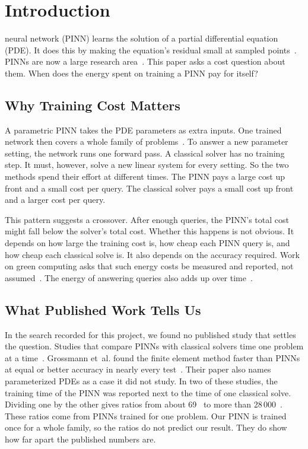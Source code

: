 \documentclass[journal]{IEEEtran}
\begin{document}
\section{Introduction}\label{sec:intro}

 neural network (PINN) learns the solution of a partial differential equation (PDE). It does this by making the equation's residual small at sampled points~\cite{raissi2019}. PINNs are now a large research area~\cite{karniadakis2021,cuomo2022,toscano2025}. This paper asks a cost question about them. When does the energy spent on training a PINN pay for itself?

\subsection{Why Training Cost Matters}
A parametric PINN takes the PDE parameters as extra inputs. One trained network then covers a whole family of problems~\cite{sun2020,wang2021deeponet}. To answer a new parameter setting, the network runs one forward pass. A classical solver has no training step. It must, however, solve a new linear system for every setting. So the two methods spend their effort at different times. The PINN pays a large cost up front and a small cost per query. The classical solver pays a small cost up front and a larger cost per query.

This pattern suggests a crossover. After enough queries, the PINN's total cost might fall below the solver's total cost. Whether this happens is not obvious. It depends on how large the training cost is, how cheap each PINN query is, and how cheap each classical solve is. It also depends on the accuracy required. Work on green computing asks that such energy costs be measured and reported, not assumed~\cite{strubell2019,schwartz2020,patterson2022}. The energy of answering queries also adds up over time~\cite{luccioni2024}.

\subsection{What Published Work Tells Us}
In the search recorded for this project, we found no published study that settles the question. Studies that compare PINNs with classical solvers time one problem at a time~\cite{grossmann2024,chuang2022,markidis2021}. Grossmann et~al. found the finite element method faster than PINNs at equal or better accuracy in nearly every test~\cite{grossmann2024}. Their paper also names parameterized PDEs as a case it did not study. In two of these studies, the training time of the PINN was reported next to the time of one classical solve. Dividing one by the other gives ratios from about 69~\cite{markidis2021} to more than 28\,000~\cite{chuang2022}. These ratios come from PINNs trained for one problem. Our PINN is trained once for a whole family, so the ratios do not predict our result. They do show how far apart the published numbers are.
\end{document}
